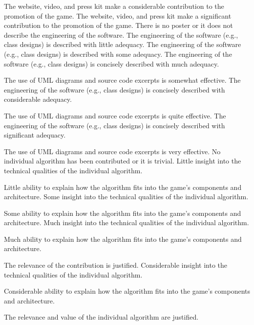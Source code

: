 \documentclass{../fal_assignment}
\begin{document}
\begin{markingrubric}
        \grade The website, video, and press kit make a considerable contribution to the promotion of the game.
        \grade The website, video, and press kit make a significant contribution to the promotion of the game.
%
        \grade\fail There is no poster or it does not describe the engineering of the software. 
        \grade The engineering of the software (e.g., class designs) is described with little adequacy.
        \grade The engineering of the software (e.g., class designs) is described with some adequacy.
        \grade The engineering of the software (e.g., class designs) is concisely described with much adequacy.
            \par The use of UML diagrams and source code excerpts is somewhat effective.
        \grade The engineering of the software (e.g., class designs) is concisely described with considerable adequacy.
            \par The use of UML diagrams and source code excerpts is quite effective.
        \grade The engineering of the software (e.g., class designs) is concisely described with significant adequacy.
            \par The use of UML diagrams and source code excerpts is very effective.
%
        \grade\fail No individual algorithm has been contributed or it is trivial.
        \grade Little insight into the technical qualities of the individual algorithm.
            \par Little ability to explain how the algorithm fits into the game's components and architecture.
        \grade Some insight into the technical qualities of the individual algorithm.
            \par Some ability to explain how the algorithm fits into the game's components and architecture.
        \grade Much insight into the technical qualities of the individual algorithm.
            \par Much ability to explain how the algorithm fits into the game's components and architecture.
            \par The relevance of the contribution is justified.
        \grade Considerable insight into the technical qualities of the individual algorithm.
            \par Considerable ability to explain how the algorithm fits into the game's components and architecture.
            \par The relevance and value of the individual algorithm are justified.

\end{markingrubric}
\end{document}
